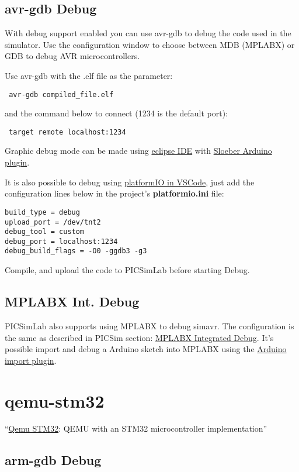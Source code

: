 \subsection{avr-gdb Debug} \hypertarget{def:gdbavr}{}
 
 With debug support enabled you can use avr-gdb to debug the code used in the simulator. 
 Use the configuration window to choose between MDB (MPLABX) or GDB to debug AVR microcontrollers. 
 
 
 Use avr-gdb with the .elf file as the parameter:
 \begin{verbatim}
 avr-gdb compiled_file.elf
 \end{verbatim}
 and the command below to connect (1234 is the default port):
 \begin{verbatim}
 target remote localhost:1234
 \end{verbatim}

Graphic debug mode can be made using \href{https://www.eclipse.org/}{eclipse IDE} with \href{https://eclipse.baeyens.it/}{Sloeber Arduino plugin}.

It is also possible to debug using \href{https://platformio.org/}{platformIO in VSCode}, just add the configuration lines below in the project's \textbf{platformio.ini} file:
\begin{verbatim}
build_type = debug
upload_port = /dev/tnt2
debug_tool = custom
debug_port = localhost:1234
debug_build_flags = -O0 -ggdb3 -g3
\end{verbatim}
Compile, and upload the code to PICSimLab before starting Debug.

\subsection{MPLABX Int. Debug }
PICSimLab also supports using MPLABX to debug simavr. The configuration is the same as described in PICSim section: \hyperlink{def:mplabxd}{MPLABX Integrated Debug}. 
It's possible import and debug a Arduino sketch into MPLABX using the \href{https://github.com/janegilruud/chipKIT-importer-2.0}{Arduino import plugin}.

 \section{qemu-stm32}
 ``\href{http://beckus.github.io/qemu_stm32/}{Qemu STM32}: QEMU with an STM32 microcontroller implementation''
 
 \subsection{arm-gdb Debug} \hypertarget{def:gdbarm}{}
 
